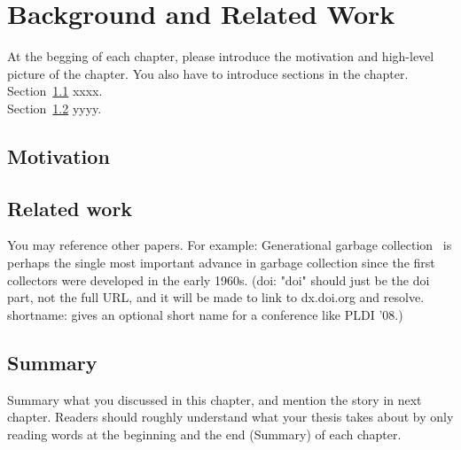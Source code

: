 \chapter{Background and Related Work}
\label{cha:background}
At the begging of each chapter, please introduce the motivation and high-level
picture of the chapter. You also have to introduce sections in the
chapter. \\


Section~\ref{sec:motivation} xxxx.\\


Section~\ref{sec:relatedwork} yyyy.\\


\section{Motivation}
\label{sec:motivation}


\section{Related work}
\label{sec:relatedwork}
You may reference other papers. For example: 
Generational garbage collection~\citep{LH:83,Moon:84,Ungar:84} is perhaps the
single most important advance in garbage collection since the first collectors
were developed in the early 1960s. (doi: "doi" should just be the doi part, not
the full URL, and it will be made to link to dx.doi.org and resolve.
shortname: gives an optional short name for a conference like PLDI '08.)





\section{Summary}
Summary what you discussed in this chapter, and mention the story in next
chapter. Readers should roughly understand what your thesis takes about by only reading
words at the beginning and the end (Summary) of each chapter.



